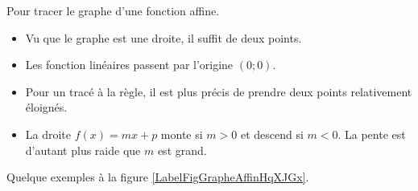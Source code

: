 Pour tracer le graphe d'une fonction affine.
\begin{itemize}
    \item
        Vu que le graphe est une droite, il suffit de deux points.
    \item
        Les fonction linéaires passent par l'origine \( (0;0)\).
    \item 
        Pour un tracé à la règle, il est plus précis de prendre deux points relativement éloignés.
    \item
        La droite \( f(x)=mx+p\) monte si \( m>0\) et descend si \( m<0\). La pente est d'autant plus raide que \( m\) est grand.
\end{itemize}

Quelque exemples à la figure \ref{LabelFigGrapheAffinHqXJGx}.
\newcommand{\CaptionFigGrapheAffinHqXJGx}{Des graphes de fonctions linéaires et affines.}


